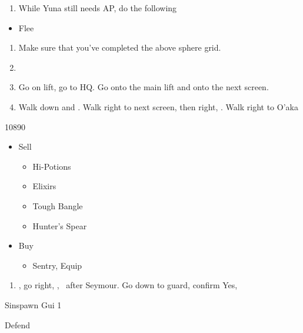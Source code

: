 \begin{multicols}{2}
\begin{encounters}
\begin{itemize}
  \end{itemize}
\end{encounters}
\begin{enumerate}[resume]
  \item While Yuna still needs AP, do the following
\end{enumerate}
\begin{encounters}
  \begin{itemize}
    \wakkaf Attack Raptors or Gandarewas
    \yunaf Defend
    \item Flee
  \end{itemize}
\end{encounters}
\begin{enumerate}[resume]
  \item Make sure that you've completed the above sphere grid.
  \item \formation{\tidus}{\yuna}{\wakka}
  \item Go on lift, go to HQ. Go onto the main lift and onto the next screen.
  \item Walk down and \sd. Walk right to next screen, then right, \sd. Walk right to O'aka
\end{enumerate}
\begin{shop}{10890}
  \begin{itemize}
    \item Sell
          \begin{itemize}
            \item Hi-Potions
            \item Elixirs
            \item Tough Bangle
            \item Hunter's Spear
          \end{itemize}
    \item Buy
          \begin{itemize}
            \item Sentry, Equip
          \end{itemize}
  \end{itemize}
\end{shop}
\begin{enumerate}[resume]
  \item \sd, go right, \cs[1:00], \sd\ after Seymour. Go down to guard, confirm Yes, \sd
\end{enumerate}
\begin{battle}[12000]{Sinspawn Gui 1}
  \begin{itemize}
    \tidusf Defend

\end{itemize}
\end{battle}
\end{multicols}
